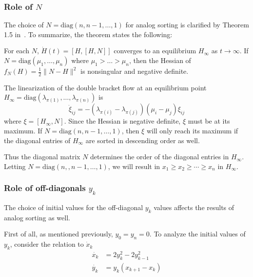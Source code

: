 

%


\subsubsection{Role of $N$}
The choice of $N = \text{diag} (n, n-1, \dots, 1)$ for analog sorting is clarified by Theorem 1.5 in~\cite{helmke}. To summarize, the theorem states the following: 

For each $N$,  $\dot{H}(t) = [H,[H,N]]$ converges to an equilibrium $H_\infty$ as $t\rightarrow \infty$. If $N=\text{diag} (\mu_1 , \dots , \mu_n)$ where $\mu_1 > \dots > \mu_n$, then the Hessian of $f_N(H) = \frac{1}{2}\|N-H\|^2$ is nonsingular and negative definite. 

The linearization of the double bracket flow at an equilibrium point $H_\infty = \text{diag}(\lambda_{\pi(1)},\dots,\lambda_{\pi(n)})$ is 
\[\dot \xi_{ij} = -(\lambda_{\pi(i)}-\lambda_{\pi(j)})(\mu_i-\mu_j)\xi_{ij}\]
where $\xi = [H_\infty, N]$. Since the Hessian is negative definite, $\xi$ must be at its maximum. If $N = \text{diag} (n, n-1, \dots, 1)$, then $\xi$ will only reach its maximum if the diagonal entries of $H_\infty$ are sorted in descending order as well.

Thus the diagonal matrix $N$ determines the order of the diagonal entries in $H_\infty$. Letting $N = \text{diag}(n, ,n-1, \dots, 1)$, we will result in $x_1 \geq x_2 \geq \cdots \geq x_n$ in $H_\infty$.

\subsubsection{Role of off-diagonals $y_k$}
The choice of initial values for the off-diagonal $y_k$ values affects the results of analog sorting as well. 

First of all, as mentioned previously, $y_0=y_n=0$.
To analyze the initial values of $y_k$, consider the relation to $\dot x_k$
\begin{align*}
    \dot{x_k} &=  2y^2_k-2y^2_{k-1} \\
    \dot{y_k} &= y_k(x_{k+1}-x_k) 
\end{align*}

